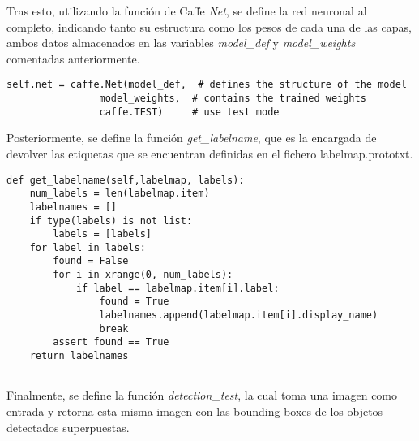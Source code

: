 \documentclass[a4paper, 12pt, oneside]{book}
\begin{document}
Tras esto, utilizando la función de Caffe \textit{Net}, se define la red neuronal al completo, indicando tanto su estructura como los pesos de cada una de las capas, ambos datos almacenados en las variables \textit{model\_def} y \textit{model\_weights} comentadas anteriormente.\\

\begin{lstlisting}[frame=single]
self.net = caffe.Net(model_def,  # defines the structure of the model
				model_weights,  # contains the trained weights
				caffe.TEST)     # use test mode
\end{lstlisting}

Posteriormente, se define la función \textit{get\_labelname}, que es la encargada de devolver las etiquetas que se encuentran definidas en el fichero {labelmap.prototxt}.\\

\begin{lstlisting}[frame=single]
def get_labelname(self,labelmap, labels):
    num_labels = len(labelmap.item)
    labelnames = []
    if type(labels) is not list:
        labels = [labels]
    for label in labels:
        found = False
        for i in xrange(0, num_labels):
            if label == labelmap.item[i].label:
                found = True
                labelnames.append(labelmap.item[i].display_name)
                break
        assert found == True
    return labelnames
    
\end{lstlisting}

Finalmente, se define la función \textit{detection\_test}, la cual toma una imagen como entrada y retorna esta misma imagen con las bounding boxes de los objetos detectados superpuestas.
\end{document}
